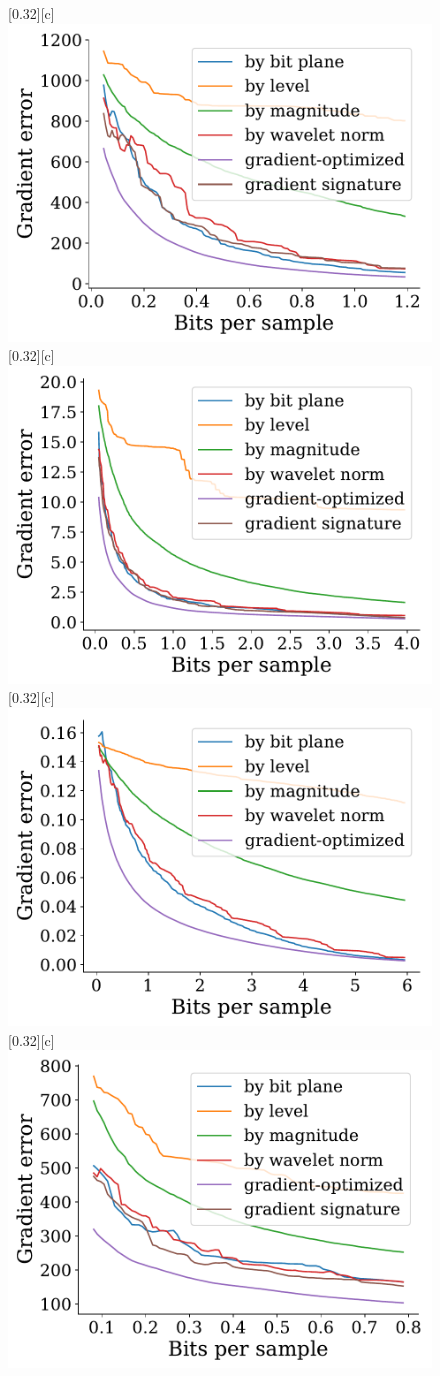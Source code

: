 \documentclass{article}
\begin{document}
\begin{figure}[htb]
        \centering
        [0.32\linewidth][c]{%
               \includegraphics[width=0.3\linewidth]{img/supplementary/gradient-optimized-flame}}
        [0.32\linewidth][c]{%
               \includegraphics[width=0.3\linewidth]{img/supplementary/gradient-optimized-csafe}}
        [0.32\linewidth][c]{%
               \includegraphics[width=0.3\linewidth]{img/supplementary/gradient-optimized-enzo-v}}
        [0.32\linewidth][c]{%
               \includegraphics[width=0.3\linewidth]{img/supplementary/gradient-optimized-foam}}

\end{figure}
\end{document}
